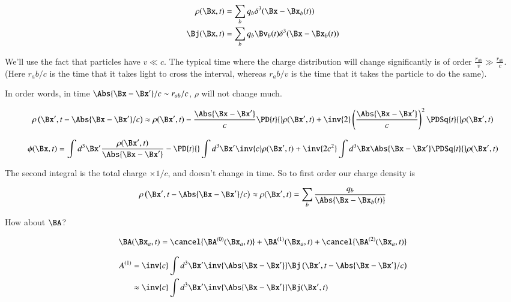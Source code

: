 \begin{align}\label{eqn:relativisticElectrodynamicsL25:230}
\rho(\Bx, t) &= \sum_b q_b \delta^3 (\Bx - \Bx_b(t)) \\
\Bj(\Bx, t) &= \sum_b q_b \Bv_b(t) \delta^3 (\Bx - \Bx_b(t))
\end{align}

We'll use the fact that particles have $v \ll c$.  The typical time where the charge distribution will change significantly is of order $\frac{r_{ab}}{v} \gg \frac{r_{ab}}{c}$.  (Here $r_ab/c$ is the time that it takes light to cross the interval, whereas $r_ab/v$ is the time that it takes the particle to do the same).

In order words, in time $\Abs{\Bx - \Bx'}/c \sim r_{ab}/c$, $\rho$ will not change much.

\begin{equation}\label{eqn:relativisticElectrodynamicsL25:250}
\rho\left(\Bx', t - \Abs{\Bx - \Bx'}/c\right) \approx \rho(\Bx', t) 
- \frac{\Abs{\Bx - \Bx'}}{c} \PD{t}{} \rho(\Bx', t) + \inv{2} \left(\frac{\Abs{\Bx - \Bx'}}{c}\right)^2 \PDSq{t}{} \rho(\Bx', t) 
\end{equation}

\begin{equation}\label{eqn:relativisticElectrodynamicsL25:270}
\phi(\Bx, t) 
= \int d^3 \Bx' \frac{\rho(\Bx', t)}{\Abs{\Bx - \Bx'}} - \PD{t}{} \int d^3 \Bx' \inv{c} \rho(\Bx', t) 
+
\inv{2 c^2} \int d^3 \Bx \Abs{\Bx - \Bx'} \PDSq{t}{} \rho(\Bx', t) 
\end{equation}

The second integral is the total charge $\times 1/c$, and doesn't change in time.  So to first order our charge density is

\begin{equation}\label{eqn:relativisticElectrodynamicsL25:290}
\rho\left(\Bx', t - \Abs{\Bx - \Bx'}/c\right) \approx \rho(\Bx', t) = \sum_b \frac{q_b}{\Abs{\Bx - \Bx_b(t)}}
\end{equation}


How about $\BA$?

\begin{equation}\label{eqn:relativisticElectrodynamicsL25:310}
\BA(\Bx_a, t) = 
\cancel{\BA^{(0)}(\Bx_a, t)}
+\BA^{(1)}(\Bx_a, t)
+\cancel{\BA^{(2)}(\Bx_a, t)}
\end{equation}

\begin{align*}
A^{(1)} 
&= \inv{c} \int d^3 \Bx' \inv{\Abs{\Bx - \Bx'}} \Bj\left(\Bx', t - \Abs{\Bx - \Bx'}/c\right)  \\
&\approx \inv{c} \int d^3 \Bx' \inv{\Abs{\Bx - \Bx'}} \Bj(\Bx', t)
\end{align*}

